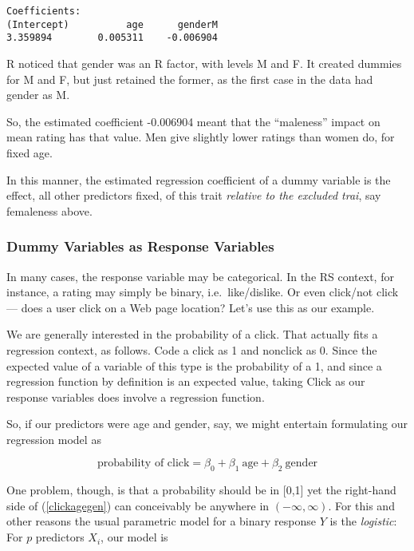 \begin{lstlisting}
Coefficients:
(Intercept)          age      genderM  
3.359894        0.005311    -0.006904  
\end{lstlisting}

R noticed that gender was an R factor, with levels M and F.  It created
dummies for M and F, but just retained the former, as the first case in
the data had gender as M.

So, the estimated coefficient -0.006904 meant that the ``maleness''
impact on mean rating has that value.  Men give slightly lower
ratings than women do, for fixed age.

In this manner, the estimated regression coefficient of a dummy variable
is the effect, all other predictors fixed, of this trait
\textit{relative to the excluded trai}, say femaleness above.

\subsubsection{Dummy Variables as Response Variables}

In many cases, the response variable may be categorical.  In the RS
context, for instance, a rating may simply be binary, i.e.\
like/dislike.  Or even click/not click --- does a user click on a Web page
location?  Let's use this as our example.

We are generally interested in the probability of a click.  That
actually fits a regression context, as follows.  Code a click as 1 and
nonclick as 0.  Since the expected value of a variable of this type is
the probability of a 1, and since a regression function by definition
is an expected value, taking Click as our response variables does
involve a regression function.

So, if our predictors were age and gender, say, we might entertain
formulating our regression model as

\begin{equation}
\label{clickagegen}
\textrm{probability of click} = \beta_0 + \beta_1 ~ \textrm{age} +
\beta_2 ~ \textrm{gender}
\end{equation}

One problem, though, is that a probability should be in [0,1] yet the
right-hand side of (\ref{clickagegen}) can conceivably be anywhere in
$(-\infty,\infty)$.  For this and other reasons the usual parametric
model for a binary response $Y$ is the \textit{logistic}:  For $p$
predictors $X_i$, our model is

